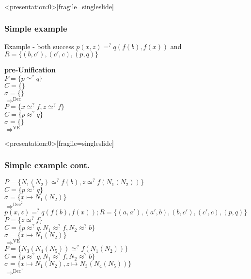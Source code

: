 		
		\begin{frame}<presentation:0>[fragile=singleslide]
	\frametitle{Simple example}
	\begin{exampleblock}{Example - both success}
	\(p(x,z) =^? q(f(b),f(x))\) and \(R=\{(b,c'),(c',c),(p,q)\}\)\\
	\end{exampleblock}
	\textbf{pre-Unification} \\
	
	\(P=\{p \simeq^? q\}\)\\
	\(C=\{\}\)\\
	\(\sigma=\{\}\)\\
	\(\Rightarrow^{\text{Dec}}\)\\
	\(P=\{x \simeq^? f, z \simeq^? f\}\)\\
	\(C=\{p \approx^? q\}\)\\
	\(\sigma=\{\}\)\\
	\(\Rightarrow^{\text{VE}}\)\\
	
	\end{frame}
	\begin{frame}<presentation:0>[fragile=singleslide]
	\frametitle{Simple example cont.}
	\(P=\{N_1(N_2) \simeq^? f(b), z \simeq^? f(N_1(N_2))\}\)\\
	\(C=\{p \approx^? q\}\)\\
	\(\sigma=\{x \mapsto N_1(N_2)\}\)\\
	\(\Rightarrow^{\text{Dec}^2}\)\\
	\(p(x,z) =^? q(f(b),f(x)) ; R=\{(a,a'),(a',b),(b,c'),(c',c),(p,q)\}\)\\
	\(P=\{z \simeq^? f\}\)\\
	\(C=\{p \approx^? q, N_1 \approx^? f, N_2 \approx^? b\}\)\\
	\(\sigma=\{x \mapsto N_1(N_2)\}\)\\
	\(\Rightarrow^{\text{VE}}\)\\
	\(P=\{N_3(N_4(N_5)) \simeq^? f(N_1(N_2))\}\)\\
	\(C=\{p \approx^? q, N_1 \approx^? f, N_2 \approx^? b\}\)\\
	\(\sigma=\{x \mapsto N_1(N_2),z \mapsto N_3(N_4(N_5))\}\)\\
	\(\Rightarrow^{\text{Dec}^3}\)\\
	\end{frame}
	
